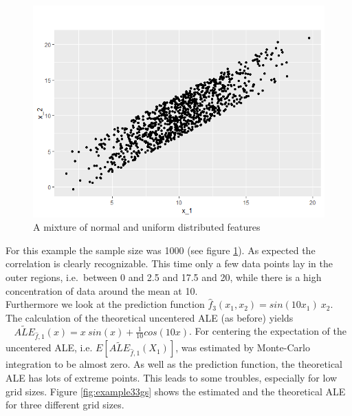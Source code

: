 \documentclass[]{krantz}
\begin{document}
\begin{figure}
\includegraphics[width=1\linewidth]{images/ALE_2_dataset2_} \caption{A mixture of normal and uniform distributed features}\label{fig:datasetALE2}
\end{figure}



For this example the sample size was 1000 (see figure
\ref{fig:datasetALE2}). As expected the correlation is clearly
recognizable. This time only a few data points lay in the outer regions,
i.e.~between 0 and 2.5 and 17.5 and 20, while there is a high
concentration of data around the mean at 10.\\
Furthermore we look at the prediction function
\(\hat{f}_3(x_1,x_2) = sin(10x_1)~x_2\). The calculation of the
theoretical uncentered ALE (as before) yields
\(~~~~\widetilde{ALE}_{\hat{f},1}(x) = x~sin(x) + \frac{1}{10}cos(10x)\).
For centering the expectation of the uncentered ALE, i.e.
\(E[\widetilde{ALE}_{\hat{f},1}(X_1)]\), was estimated by Monte-Carlo
integration to be almost zero. As well as the prediction function, the
theoretical ALE has lots of extreme points. This leads to some troubles,
especially for low grid sizes. Figure \ref{fig:example33gs} shows the
estimated and the theoretical ALE for three different grid sizes.
\end{document}
